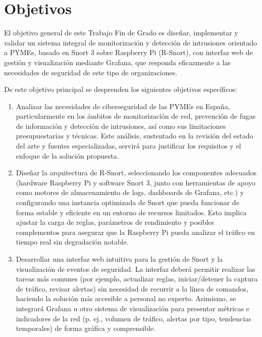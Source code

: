 \documentclass[11pt,a4paper,twoside]{report}
\begin{document}
\section{Objetivos}

El objetivo general de este Trabajo Fin de Grado es diseñar, implementar y validar un sistema integral de monitorización y detección de intrusiones orientado a PYMEs, basado en Snort 3 sobre Raspberry Pi (R-Snort), con interfaz web de gestión y visualización mediante Grafana, que responda eficazmente a las necesidades de seguridad de este tipo de organizaciones.\newline

De este objetivo principal se desprenden los siguientes objetivos específicos:

\begin{enumerate}
	\item Analizar las necesidades de ciberseguridad de las PYMEs en España, particularmente en los ámbitos de monitorización de red, prevención de fugas de información y detección de intrusiones, así como sus limitaciones presupuestarias y técnicas. Este análisis, sustentado en la revisión del estado del arte y fuentes especializadas, servirá para justificar los requisitos y el enfoque de la solución propuesta.
	
	\item Diseñar la arquitectura de R-Snort, seleccionando los componentes adecuados (hardware Raspberry Pi y software Snort 3, junto con herramientas de apoyo como motores de almacenamiento de logs, dashboards de Grafana, etc.) y configurando una instancia optimizada de Snort que pueda funcionar de forma estable y eficiente en un entorno de recursos limitados. Esto implica ajustar la carga de reglas, parámetros de rendimiento y posibles complementos para asegurar que la Raspberry Pi pueda analizar el tráfico en tiempo real sin degradación notable.
	
	\item Desarrollar una interfaz web intuitiva para la gestión de Snort y la visualización de eventos de seguridad. La interfaz deberá permitir realizar las tareas más comunes (por ejemplo, actualizar reglas, iniciar/detener la captura de tráfico, revisar alertas) sin necesidad de recurrir a la línea de comandos, haciendo la solución más accesible a personal no experto. Asimismo, se integrará Grafana u otro sistema de visualización para presentar métricas e indicadores de la red (p. ej., volumen de tráfico, alertas por tipo, tendencias temporales) de forma gráfica y comprensible.
	

\end{enumerate}
\end{document}
